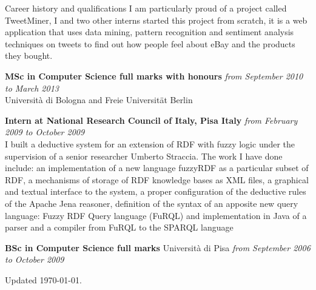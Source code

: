 \documentclass{resume}
\begin{document}
\begin{rSection}{Career history and qualifications}
			I am particularly proud of a project called TweetMiner, 
			I and two other interns started this project from scratch,
			it is a web application that uses data mining, pattern recognition and sentiment analysis 
			techniques on tweets to find out how people feel about eBay and the products they bought. 

		{\bf MSc in Computer Science full marks with honours} \hfill {\em from September 2010 to March 2013} \\
		Universit\`a di Bologna and Freie Universit\"at Berlin 

		{\bf Intern at National Research Council of Italy, Pisa Italy} \hfill {\em from February 2009 to October 2009}\\
			I built a deductive system for an extension of RDF with fuzzy logic under the supervision of a senior researcher Umberto Straccia.
			The work I have done include:
			an implementation of a new language fuzzyRDF as a particular subset of RDF,
			a mechanisms of storage of RDF knowledge bases as XML files,
			a graphical and textual interface to the system,
			a proper configuration of the deductive rules of the Apache Jena reasoner,
			definition of the syntax of an apposite new query language: Fuzzy RDF Query language (FuRQL)
			and implementation in Java of a parser and a compiler from FuRQL to the SPARQL language 

		{\bf BSc in Computer Science full marks} Universit\`a di Pisa \hfill {\em from September 2006 to October 2009} \\
	\end{rSection}
	\begin{rSection}{}
		Updated \today.
	\end{rSection}
\end{document}
